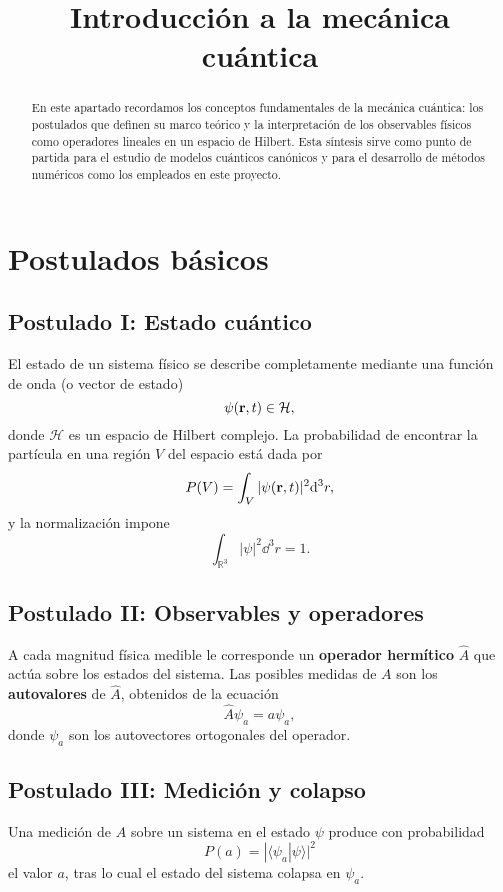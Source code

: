 \documentclass[11pt]{article}
\title{Introducción a la mecánica cuántica}
\date{}
\begin{document}
\maketitle

\begin{abstract}
En este apartado recordamos los conceptos fundamentales de la mecánica cuántica: los postulados que definen su marco teórico y la interpretación de los observables físicos como operadores lineales en un espacio de Hilbert. Esta síntesis sirve como punto de partida para el estudio de modelos cuánticos canónicos y para el desarrollo de métodos numéricos como los empleados en este proyecto.
\end{abstract}

\section{Postulados básicos}
\label{sec:postulados}

\subsection{Postulado I: Estado cuántico}
El estado de un sistema físico se describe completamente mediante una función de onda (o vector de estado)
\[
\psi(\vb{r},t) \in \mathcal{H},
\]
donde \(\mathcal{H}\) es un espacio de Hilbert complejo.  
La probabilidad de encontrar la partícula en una región \(V\) del espacio está dada por
\[
P(V) = \int_V |\psi(\vb{r},t)|^2 \dd^3 r,
\]
y la normalización impone
\[
\int_{\mathbb{R}^3} |\psi|^2 \dd^3 r = 1.
\]

\subsection{Postulado II: Observables y operadores}
A cada magnitud física medible le corresponde un \textbf{operador hermítico} \(\hat{A}\) que actúa sobre los estados del sistema.  
Las posibles medidas de \(A\) son los \textbf{autovalores} de \(\hat{A}\), obtenidos de la ecuación
\[
\hat{A}\psi_a = a\psi_a,
\]
donde \(\psi_a\) son los autovectores ortogonales del operador.

\subsection{Postulado III: Medición y colapso}
Una medición de \(A\) sobre un sistema en el estado \(\psi\) produce con probabilidad
\[
P(a) = |\langle \psi_a | \psi \rangle|^2
\]
el valor \(a\), tras lo cual el estado del sistema colapsa en \(\psi_a\).
\end{document}
